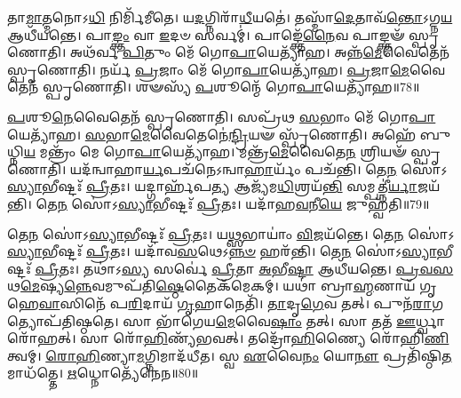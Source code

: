 𑌤𑌾\-\ul{𑌮𑌾}\-𑌤𑍍𑌮𑌨𑍋𑌽\-\ul{𑌧𑌿} 𑌨𑌿𑌰𑍍𑌮𑌿᳴𑌮𑍀𑌤𑍇।
𑌯\-\ul{𑌦}\-𑌗𑍍𑌨𑌿𑌰𑌾᳴\-\ul{𑌧𑍀}\-𑌯𑌤𑍇॑।
𑌤𑌸𑍍𑌮𑌾᳴\-\ul{𑌦𑍇}\-𑌤𑌾𑌵᳴\-\ul{𑌨𑍍𑌤𑍋}\-\-𑌽𑌗𑍍𑌨\-\ul{𑌯} 𑌆𑌧𑍀᳴𑌯𑌨𑍍𑌤𑍇।
𑌪𑌾\-\ul{𑌙𑍍𑌕𑍍𑌤𑌂} 𑌵𑌾 \ul{𑌇}\-𑌦𑍞 𑌸𑌰𑍍𑌵𑌮𑍍॑।
𑌪𑌾𑌙𑍍𑌕𑍍𑌤𑍇᳴\-\ul{𑌨𑍈}\-𑌵 𑌪𑌾𑌙𑍍𑌕𑍍𑌤𑍟᳴ 𑌸𑍍𑌪𑍃𑌣𑍋𑌤𑌿।
𑌅𑌥᳴𑌰𑍍𑌵 \ul{𑌪𑌿}\-𑌤𑍁𑌂 𑌮𑍇᳴ 𑌗𑍋\-\ul{𑌪𑌾}\-𑌯𑍇𑌤𑍍𑌯𑌾᳴𑌹।
𑌅𑌨𑍍𑌨᳴\-\ul{𑌮𑍇}\-𑌵𑍈𑌤𑍇𑌨᳴ 𑌸𑍍𑌪𑍃𑌣𑍋𑌤𑌿।
𑌨𑌰𑍍𑌯᳴ \ul{𑌪𑍍𑌰}\-𑌜𑌾𑌂 𑌮𑍇᳴ 𑌗𑍋\-\ul{𑌪𑌾}\-𑌯𑍇𑌤𑍍𑌯𑌾᳴𑌹।
\-\ul{𑌪𑍍𑌰}\-𑌜𑌾\-\ul{𑌮𑍇}\-𑌵𑍈𑌤𑍇𑌨᳴ 𑌸𑍍𑌪𑍃𑌣𑍋𑌤𑌿।
𑌶𑍟𑌸𑍍𑌯᳴ \ul{𑌪}\-𑌶𑍂𑌨𑍍𑌮𑍇᳴ 𑌗𑍋\-\ul{𑌪𑌾}\-𑌯𑍇𑌤𑍍𑌯𑌾᳴𑌹॥78॥

\-\ul{𑌪}\-𑌶𑍂\-\ul{𑌨𑍇}\-𑌵𑍈𑌤𑍇𑌨᳴ 𑌸𑍍𑌪𑍃𑌣𑍋𑌤𑌿।
𑌸𑌪𑍍𑌰᳴𑌥 \ul{𑌸}\-𑌭𑌾𑌂 𑌮𑍇᳴ 𑌗𑍋\-\ul{𑌪𑌾}\-𑌯𑍇𑌤𑍍𑌯𑌾᳴𑌹।
\-\ul{𑌸}\-𑌭𑌾\-\ul{𑌮𑍇}\-𑌵𑍈𑌤𑍇𑌨𑍇॑\-\ul{𑌨𑍍𑌦𑍍𑌰𑌿}\-𑌯𑍟 𑌸𑍍𑌪𑍃᳴𑌣𑍋𑌤𑌿।
𑌅𑌹𑍇᳴ 𑌬𑍁𑌧𑍍𑌨𑌿\-\ul{𑌯} 𑌮𑌨𑍍𑌤𑍍𑌰𑌂᳴ 𑌮𑍇 𑌗𑍋\-\ul{𑌪𑌾}\-𑌯𑍇𑌤𑍍𑌯𑌾᳴𑌹।
𑌮𑌨𑍍𑌤𑍍𑌰᳴\-\ul{𑌮𑍇}\-𑌵𑍈𑌤𑍇\-\ul{𑌨} 𑌶𑍍𑌰𑌿𑌯𑍟᳴ 𑌸𑍍𑌪𑍃𑌣𑍋𑌤𑌿।
𑌯𑌦᳴𑌨𑍍𑌵𑌾𑌹𑌾\-\ul{𑌰𑍍𑌯}\-𑌪𑌚᳴𑌨𑍇\-𑌽𑌨𑍍𑌵𑌾\-\ul{𑌹𑌾}\-𑌰𑍍𑌯𑌂᳴ 𑌪𑌚᳴𑌨𑍍𑌤𑌿।
𑌤𑍇\-\ul{𑌨} 𑌸𑍋॑\-𑌽\-\ul{𑌸𑍍𑌯𑌾}\-𑌭𑍀𑌷𑍍𑌟𑌃᳴ \ul{𑌪𑍍𑌰𑍀}\-𑌤𑌃।
𑌯𑌦𑍍𑌗𑌾𑌰𑍍\mbox{}𑌹᳴𑌪\-\ul{𑌤𑍍𑌯} 𑌆𑌜𑍍𑌯᳴𑌮\-\ul{𑌧𑌿}\-𑌶𑍍𑌰𑌯᳴\-\ul{𑌨𑍍𑌤𑌿} 𑌸𑌮𑍍𑌪𑌤𑍍𑌨𑍀॑\-\ul{𑌰𑍍𑌯𑌾}\-𑌜𑌯᳴𑌨𑍍𑌤𑌿।
𑌤𑍇\-\ul{𑌨} 𑌸𑍋॑\-𑌽\-\ul{𑌸𑍍𑌯𑌾}\-𑌭𑍀𑌷𑍍𑌟𑌃᳴ \ul{𑌪𑍍𑌰𑍀}\-𑌤𑌃।
𑌯𑌦𑌾᳴𑌹\-\ul{𑌵}\-𑌨𑍀\-\ul{𑌯𑍇} 𑌜𑍁𑌹𑍍𑌵᳴𑌤𑌿॥79॥

𑌤𑍇\-\ul{𑌨} 𑌸𑍋॑\-𑌽\-\ul{𑌸𑍍𑌯𑌾}\-𑌭𑍀𑌷𑍍𑌟𑌃᳴ \ul{𑌪𑍍𑌰𑍀}\-𑌤𑌃।
𑌯\-\ul{𑌥𑍍𑌸}\-𑌭𑌾𑌯𑌾𑌂॑ \ul{𑌵𑌿}\-𑌜𑌯᳴𑌨𑍍𑌤𑍇।
𑌤𑍇\-\ul{𑌨} 𑌸𑍋॑\-𑌽\-\ul{𑌸𑍍𑌯𑌾}\-𑌭𑍀𑌷𑍍𑌟𑌃᳴ \ul{𑌪𑍍𑌰𑍀}\-𑌤𑌃।
𑌯𑌦𑌾᳴𑌵\-\ul{𑌸}\-𑌥𑍇\-𑌽\-\ul{𑌨𑍍𑌨}\-\-\ul{𑍞} 𑌹𑌰᳴𑌨𑍍𑌤𑌿।
𑌤𑍇\-\ul{𑌨} 𑌸𑍋॑\-𑌽\-\ul{𑌸𑍍𑌯𑌾}\-𑌭𑍀𑌷𑍍𑌟𑌃᳴ \ul{𑌪𑍍𑌰𑍀}\-𑌤𑌃।
𑌤𑌥𑌾॑𑌽\-\ul{𑌸𑍍𑌯} 𑌸𑌰𑍍𑌵𑍇॑ \ul{𑌪𑍍𑌰𑍀}\-𑌤𑌾 \ul{𑌅}\-𑌭𑍀\-\ul{𑌷𑍍𑌟𑌾} 𑌆𑌧𑍀᳴𑌯𑌨𑍍𑌤𑍇।
\-\ul{𑌪𑍍𑌰}\-\-\ul{𑌵}\-\-\ul{𑌸}\-𑌥\-\ul{𑌮𑍇}\-𑌷𑍍𑌯\-\ul{𑌨𑍍𑌨𑍇}\-𑌵𑌮𑍁𑌪᳴𑌤𑌿\-\ul{𑌷𑍍𑌠𑍇}\-𑌤𑍈𑌕᳴𑌮𑍇𑌕𑌮𑍍।
𑌯𑌥𑌾॑ 𑌬𑍍𑌰𑌾\-\ul{𑌹𑍍𑌮}\-𑌣𑌾𑌯᳴ 𑌗𑍃𑌹𑍇\-\ul{𑌵𑌾}\-𑌸𑌿𑌨𑍇᳴ 𑌪\-\ul{𑌰𑌿}\-𑌦𑌾𑌯᳴ \ul{𑌗𑍃}\-𑌹𑌾𑌨𑍇𑌤𑌿᳴।
\-\ul{𑌤𑌾}\-𑌦𑍃\-\ul{𑌗𑍇}\-𑌵 𑌤𑌤𑍍।
𑌪𑍁𑌨᳴\-\ul{𑌰𑌾}\-𑌗𑌤𑍍𑌯𑍋𑌪᳴𑌤𑌿𑌷𑍍𑌠𑌤𑍇।
𑌸𑌾 𑌭𑌾᳴𑌗𑍇𑌯\-\ul{𑌮𑍇}\-𑌵𑍈\-\ul{𑌷𑌾𑌂} 𑌤𑌤𑍍।
𑌸𑌾 𑌤𑌤᳴ \ul{𑌊}\-𑌰𑍍𑌧𑍍𑌵𑌾𑌰𑍋᳴𑌹𑌤𑍍।
𑌸𑌾 𑌰𑍋᳴\-\ul{𑌹𑌿}\-𑌣𑍍𑌯᳴𑌭𑌵𑌤𑍍।
𑌤𑌦𑍍𑌰𑍋᳴\-\ul{𑌹𑌿}\-𑌣𑍍𑌯𑍈 𑌰𑍋᳴𑌹𑌿\-\ul{𑌣𑌿}\-𑌤𑍍𑌵𑌮𑍍।
\-\ul{𑌰𑍋}\-\-\ul{𑌹𑌿}\-𑌣𑍍𑌯𑌾\-\ul{𑌮}\-𑌗𑍍𑌨𑌿𑌮𑌾𑌦᳴𑌧𑍀𑌤।
𑌸𑍍𑌵 \ul{𑌏}\-𑌵𑍈\-\ul{𑌨𑌂} 𑌯𑍋\-\ul{𑌨𑍗} 𑌪𑍍𑌰𑌤𑌿᳴\-𑌷𑍍𑌠𑌿\-\ul{𑌤}\-𑌮𑌾𑌧᳴𑌤𑍍𑌤𑍇।
\-\ul{𑌋}\-𑌧𑍍𑌨𑍋𑌤𑍍𑌯𑍇᳴𑌨𑍇𑌨॥80॥\anuvakamend[\-\ul{𑌏}\-𑌷𑌾 \ul{𑌪}\-𑌶𑍂𑌨𑍍𑌮𑍇᳴ 𑌗𑍋\-\ul{𑌪𑌾}\-𑌯𑍇\-\ul{𑌤𑌿} 𑌪𑍍𑌰𑌵𑌿᳴𑌷𑍍𑌟𑌾 \ul{𑌪}\-𑌶𑍂𑌨𑍍𑌮𑍇᳴ 𑌗𑍋\-\ul{𑌪𑌾}\-𑌯𑍇𑌤𑍍𑌯𑌾᳴\-\ul{𑌹} 𑌜𑍁𑌹𑍍𑌵᳴𑌤𑌿 𑌤𑌿𑌷𑍍𑌠𑌤𑍇 \ul{𑌸}\-𑌪𑍍𑌤 𑌚᳴]





